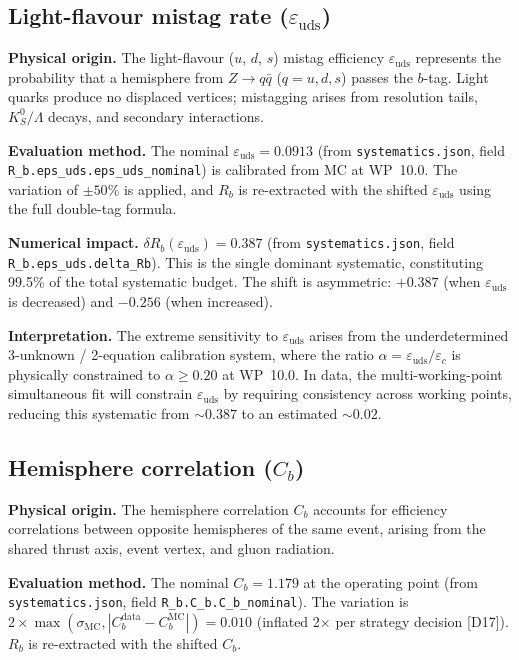 \documentclass[11pt,a4paper]{article}
\begin{document}
\subsection{Light-flavour mistag rate ($\varepsilon_\mathrm{uds}$)}
\label{sec:syst_eps_uds}

\textbf{Physical origin.} The light-flavour ($u$, $d$, $s$) mistag efficiency
$\varepsilon_\mathrm{uds}$ represents the probability that a hemisphere from
$Z \to q\bar{q}$ ($q = u, d, s$) passes the $b$-tag. Light quarks produce no
displaced vertices; mistagging arises from resolution tails, $K_S^0/\Lambda$
decays, and secondary interactions.

\textbf{Evaluation method.} The nominal $\varepsilon_\mathrm{uds} = 0.0913$
(from \texttt{systematics.json}, field \texttt{R\_b.eps\_uds.eps\_uds\_nominal})
is calibrated from MC at WP~10.0. The variation of $\pm 50\%$ is applied, and
$R_b$ is re-extracted with the shifted $\varepsilon_\mathrm{uds}$ using the
full double-tag formula.

\textbf{Numerical impact.}
$\delta R_b(\varepsilon_\mathrm{uds}) = 0.387$
(from \texttt{systematics.json}, field \texttt{R\_b.eps\_uds.delta\_Rb}).
This is the single dominant systematic, constituting 99.5\% of the total systematic
budget. The shift is asymmetric: $+0.387$ (when $\varepsilon_\mathrm{uds}$ is decreased)
and $-0.256$ (when increased).

\textbf{Interpretation.} The extreme sensitivity to $\varepsilon_\mathrm{uds}$ arises
from the underdetermined 3-unknown / 2-equation calibration system, where the ratio
$\alpha = \varepsilon_\mathrm{uds}/\varepsilon_c$ is physically constrained to
$\alpha \geq 0.20$ at WP~10.0. In data, the multi-working-point simultaneous fit
will constrain $\varepsilon_\mathrm{uds}$ by requiring consistency across working
points, reducing this systematic from $\sim 0.387$ to an estimated $\sim 0.02$.

\subsection{Hemisphere correlation ($C_b$)}
\label{sec:syst_cb}

\textbf{Physical origin.} The hemisphere correlation $C_b$ accounts for efficiency
correlations between opposite hemispheres of the same event, arising from the shared
thrust axis, event vertex, and gluon radiation.

\textbf{Evaluation method.} The nominal $C_b = 1.179$ at the operating point
(from \texttt{systematics.json}, field \texttt{R\_b.C\_b.C\_b\_nominal}). The variation
is $2 \times \max(\sigma_\mathrm{MC}, |C_b^\mathrm{data} - C_b^\mathrm{MC}|) = 0.010$
(inflated 2$\times$ per strategy decision [D17]).
$R_b$ is re-extracted with the shifted $C_b$.
\end{document}
